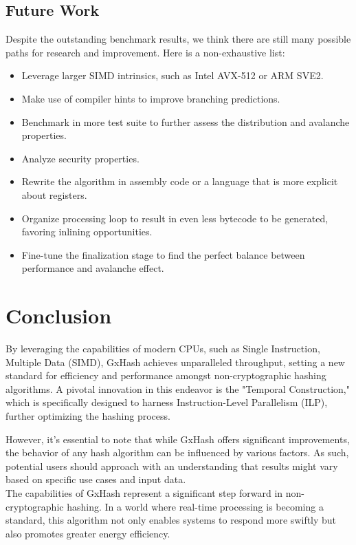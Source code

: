 \documentclass[10pt]{article}
\begin{document}
\subsection{Future Work}
Despite the outstanding benchmark results, we think there are still many possible paths for research and improvement. Here is a non-exhaustive list:
\begin{itemize}
    \item Leverage larger SIMD intrinsics, such as Intel AVX-512 or ARM SVE2.
    \item Make use of compiler hints to improve branching predictions.
    \item Benchmark in more test suite to further assess the distribution and avalanche properties.
    \item Analyze security properties.
    \item Rewrite the algorithm in assembly code or a language that is more explicit about registers.
    \item Organize processing loop to result in even less bytecode to be generated, favoring inlining opportunities.
    \item Fine-tune the finalization stage to find the perfect balance between performance and avalanche effect.
\end{itemize}

\clearpage
\section{Conclusion}

By leveraging the capabilities of modern CPUs, such as Single Instruction, Multiple Data (SIMD), GxHash achieves unparalleled throughput, setting a new standard for efficiency and performance amongst non-cryptographic hashing algorithms. A pivotal innovation in this endeavor is the "Temporal Construction," which is specifically designed to harness Instruction-Level Parallelism (ILP), further optimizing the hashing process.

However, it's essential to note that while GxHash offers significant improvements, the behavior of any hash algorithm can be influenced by various factors. As such, potential users should approach with an understanding that results might vary based on specific use cases and input data.\\

The capabilities of GxHash represent a significant step forward in non-cryptographic hashing. In a world where real-time processing is becoming a standard, this algorithm not only enables systems to respond more swiftly but also promotes greater energy efficiency.



\end{document}
